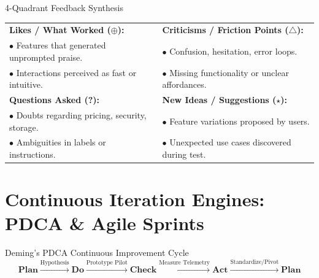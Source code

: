 \begin{canvasbox}{4-Quadrant Feedback Synthesis}
\begin{tabularx}{\linewidth}{|X|X|} \hline
\textbf{Likes / What Worked ($\oplus$):} & \textbf{Criticisms / Friction Points ($\triangle$):} \\
$\bullet$ Features that generated unprompted praise. & $\bullet$ Confusion, hesitation, error loops. \\
$\bullet$ Interactions perceived as fast or intuitive. & $\bullet$ Missing functionality or unclear affordances. \\ \hline
\textbf{Questions Asked (?):} & \textbf{New Ideas / Suggestions ($\star$):} \\
$\bullet$ Doubts regarding pricing, security, storage. & $\bullet$ Feature variations proposed by users. \\
$\bullet$ Ambiguities in labels or instructions. & $\bullet$ Unexpected use cases discovered during test. \\ \hline
\end{tabularx}
\end{canvasbox}

\section{Continuous Iteration Engines: PDCA \& Agile Sprints}

\begin{frameworkbox}{Deming's PDCA Continuous Improvement Cycle}
\[
\textbf{Plan} \xrightarrow{\text{Hypothesis}} \textbf{Do} \xrightarrow{\text{Prototype Pilot}} \textbf{Check} \xrightarrow{\text{Measure Telemetry}} \textbf{Act} \xrightarrow{\text{Standardize/Pivot}} \textbf{Plan}
\]
\end{frameworkbox}
